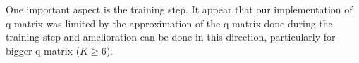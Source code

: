 \documentclass{sig-alternate}
\begin{document}
One important aspect is the training step. It appear that our implementation of q-matrix was limited by the approximation of the q-matrix done during the training step and amelioration can be done in this direction, particularly for bigger q-matrix ($K \ge 6$). 






%

%
%

\end{document}
